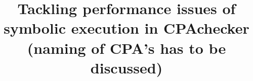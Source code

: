 \documentclass[a4paper,11pt]{article}
\begin{document}
\title{Tackling performance issues of symbolic execution in CPAchecker (naming of CPA's has to be discussed)}
\maketitle
\setcounter{tocdepth}{5}
\setcounter{secnumdepth}{5}
\tableofcontents













\end{document}
